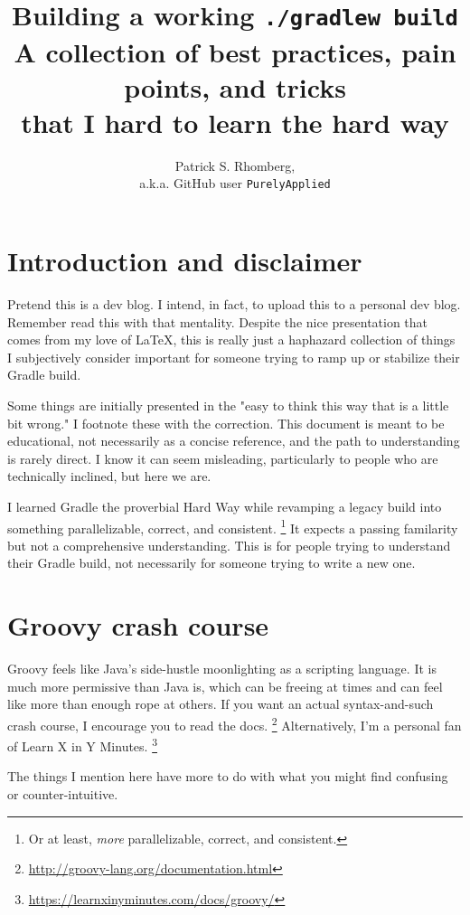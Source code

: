 \documentclass[]{article}
\title{Building a working \texttt{./gradlew build}  \large \\
  A collection of best practices, pain points, and tricks \\
  that I hard to learn the hard way}
\author{Patrick S. Rhomberg,\\ a.k.a. GitHub user \texttt{PurelyApplied}}
\theoremstyle{definition}
\begin{document}
\maketitle
\tableofcontents

\listofsnippets
\newpage

\section{Introduction and disclaimer}

Pretend this is a dev blog.
I intend, in fact, to upload this to a personal dev blog.
Remember read this with that mentality.
Despite the nice presentation that comes from my love of \LaTeX, 
this is really just a haphazard collection of things I subjectively consider important for someone trying to ramp up or stabilize their Gradle build.

Some things are initially presented in the "easy to think this way that is a little bit wrong."
I footnote these with the correction.
This document is meant to be educational, not necessarily as a concise reference, and the path to understanding is rarely direct.
I know it can seem misleading, particularly to people who are technically inclined, but here we are.

I learned Gradle the proverbial Hard Way while revamping a legacy build into something parallelizable, correct, and consistent.%
\footnote{Or at least, \emph{more} parallelizable, correct, and consistent.}
It expects a passing familarity but not a comprehensive understanding.
This is for people trying to understand their Gradle build,
  not necessarily for someone trying to write a new one.


\section{Groovy crash course}

Groovy feels like Java's side-hustle moonlighting as a scripting language.
It is much more permissive than Java is,
  which can be freeing at times and can feel like more than enough rope at others.
If you want an actual syntax-and-such crash course, I encourage you to read the docs.%
\footnote{\url{http://groovy-lang.org/documentation.html}}
Alternatively, I'm a personal fan of Learn X in Y Minutes.%
\footnote{\url{https://learnxinyminutes.com/docs/groovy/}}

The things I mention here have more to do with what you might find confusing or counter-intuitive.
\end{document}
